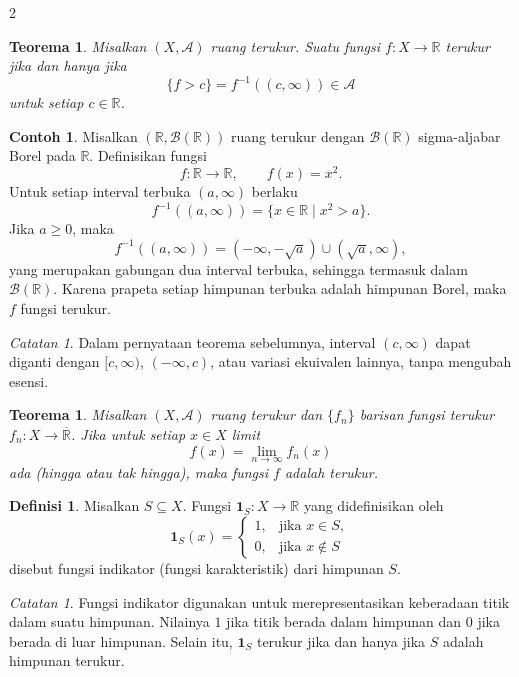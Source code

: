 \documentclass[a4paper,extrafontsizes, 9pt]{memoir}
\theoremstyle{definition}
\newtheorem{definisi}[kalstok]{Definisi}
\newtheorem{contoh}[kalstok]{Contoh}
\theoremstyle{plain}
\newtheorem{teorema}[kalstok]{Teorema}
\theoremstyle{remark}
\newtheorem{catatan}[kalstok]{Catatan}
\begin{document}
\begin{multicols}{2}
  \begin{teorema}
    Misalkan $(X,\mathcal{A})$ ruang terukur. Suatu fungsi $f:X\to\mathbb{R}$ terukur jika dan hanya jika
    \[\{f>c\}=f^{-1}((c,\infty))\in\mathcal{A}\]
    untuk setiap $c\in\mathbb{R}$.
  \end{teorema}

  \begin{contoh}
    Misalkan $(\mathbb{R},\mathcal{B}(\mathbb{R}))$ ruang terukur dengan $\mathcal{B}(\mathbb{R})$ sigma-aljabar Borel pada $\mathbb{R}$.
    Definisikan fungsi
    \[f:\mathbb{R}\to\mathbb{R},\qquad f(x)=x^2.\]
    Untuk setiap interval terbuka $(a,\infty)$ berlaku
    \[f^{-1}((a,\infty))=\{x\in\mathbb{R}\mid x^2>a\}.\]
    Jika $a\ge 0$, maka
    \[f^{-1}((a,\infty))=(-\infty,-\sqrt{a})\cup(\sqrt{a},\infty),\]
    yang merupakan gabungan dua interval terbuka, sehingga termasuk dalam $\mathcal{B}(\mathbb{R})$.
    Karena prapeta setiap himpunan terbuka adalah himpunan Borel, maka $f$ fungsi terukur.
  \end{contoh}

  \begin{catatan}
    Dalam pernyataan teorema sebelumnya, interval $(c,\infty)$ dapat diganti dengan $[c,\infty)$, $(-\infty,c)$,
    atau variasi ekuivalen lainnya, tanpa mengubah esensi.
  \end{catatan}

  \begin{teorema}
    Misalkan $(X,\mathcal{A})$ ruang terukur dan $\{f_n\}$ barisan fungsi terukur $f_n:X\to\overline{\mathbb{R}}$.
    Jika untuk setiap $x\in X$ limit
    \[f(x)=\lim_{n\to\infty}f_n(x)\]
    ada (hingga atau tak hingga), maka fungsi $f$ adalah terukur.
  \end{teorema}

  \begin{definisi}
    Misalkan $S\subseteq X$. Fungsi $\mathbf{1}_S:X\to\mathbb{R}$ yang didefinisikan oleh
    \[\mathbf{1}_S(x)=\begin{cases}
        1, & \text{jika } x\in S,   \\
        0, & \text{jika } x\notin S
      \end{cases}\]
    disebut fungsi indikator (fungsi karakteristik) dari himpunan $S$.
  \end{definisi}

  \begin{catatan}
    Fungsi indikator digunakan untuk merepresentasikan keberadaan titik dalam suatu himpunan.
    Nilainya $1$ jika titik berada dalam himpunan dan $0$ jika berada di luar himpunan.
    Selain itu, $\mathbf{1}_S$ terukur jika dan hanya jika $S$ adalah himpunan terukur.
  \end{catatan}


\end{multicols}
\end{document}
